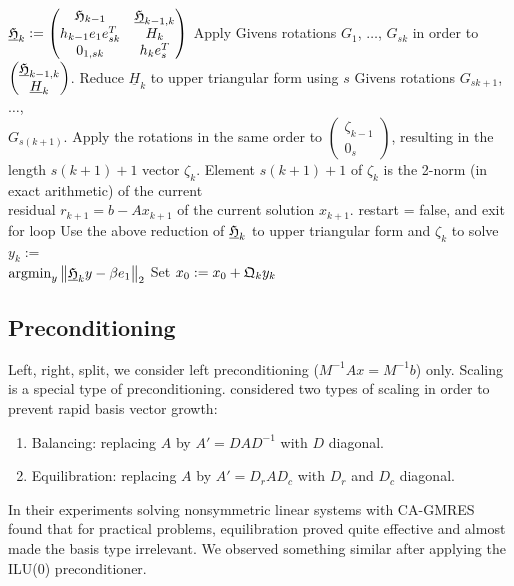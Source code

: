 \documentclass{scrartcl}
\numberwithin{equation}{section}
\newcommand{\norm}[1]{\left\lVert#1\right\rVert}
\begin{document}
\begin{algorithm}[H]
\begin{algorithmic}[1]
			\STATE $\underline{\frak{H}}_k := 
			\begin{pmatrix}
				\frak{H}_{k - 1} & \underline{\frak{H}}_{k - 1,k} \\
				h_{k - 1} e_1 e^T_{sk} & H_k \\
				0_{1,sk} & h_k e^T_s \\
			\end{pmatrix}$
			\STATE Apply Givens rotations $G_1$, $\ldots$, $G_{sk}$ in order to $\begin{pmatrix}
	\underline{\frak{H}}_{k - 1,k} \\
	\underline{H}_k \\
\end{pmatrix}$.
			\STATE Reduce $\underline{H}_k$ to upper triangular form using $s$ Givens rotations $G_{sk + 1}$, $\ldots$, \\
\hspace{\algorithmicindent} $G_{s(k + 1)}$. Apply the rotations in the same order to $\begin{pmatrix}
	\zeta_{k - 1} \\
	0_s
\end{pmatrix}$, resulting in the \\
\hspace{\algorithmicindent} length \mbox{$s(k + 1) + 1$} vector $\zeta_k$.
		\ENDIF
	\STATE Element $s(k + 1) + 1$ of $\zeta_k$ is the 2-norm (in exact arithmetic) of the current \\
\hspace{\algorithmicindent} residual $r_{k + 1} = b - Ax_{k + 1}$ of the current solution $x_{k + 1}$.
		\STATE restart = false, and exit for loop
	\ENDIF
	\ENDFOR
	\STATE Use the above reduction of $\underline{\frak{H}}_k$ to upper triangular form and $\zeta_k$ to solve $y_k :=$ \\ \hspace{\algorithmicindent} $\text{argmin}_{y} \norm{\underline{\frak{H}}_k y - \beta e_1}_2$
	\STATE Set $x_0 := x_0 + \frak{Q}_k y_k$
	\ENDWHILE
\end{algorithmic}
\end{algorithm}

\subsection{Preconditioning}
Left, right, split, we consider left preconditioning ($M^{-1}Ax = M^{-1}b$) only.
Scaling is a special type of preconditioning. \cite{Hoemmen:2010:CKS:1970638} considered two types of scaling in order to prevent rapid basis vector growth:
\begin{enumerate}
\item Balancing: replacing $A$ by $A' = DAD^{-1}$ with $D$ diagonal.
\item Equilibration: replacing $A$ by $A' = D_rAD_c$ with $D_r$ and $D_c$ diagonal.
\end{enumerate}
In their experiments solving nonsymmetric linear systems with CA-GMRES \cite{Hoemmen:2010:CKS:1970638} found that for practical problems, equilibration proved quite effective and almost made the basis type irrelevant. We observed something similar after applying the ILU(0) preconditioner.
\end{document}
